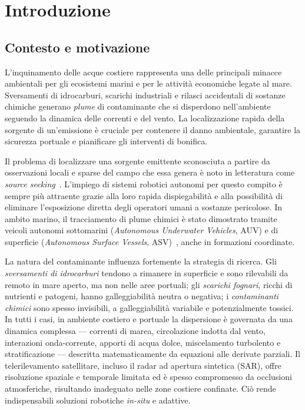\chapter{Introduzione}
\label{cap:intro}

\section{Contesto e motivazione}

L'inquinamento delle acque costiere rappresenta una delle principali minacce
ambientali per gli ecosistemi marini e per le attivit\`a economiche legate al mare.
Sversamenti di idrocarburi, scarichi industriali e rilasci accidentali di sostanze
chimiche generano \emph{plume} di contaminante che si disperdono nell'ambiente
seguendo la dinamica delle correnti e del vento. La localizzazione rapida della
sorgente di un'emissione \`e cruciale per contenere il danno ambientale, garantire la
sicurezza portuale e pianificare gli interventi di bonifica.

Il problema di localizzare una sorgente emittente sconosciuta a partire da osservazioni
locali e sparse del campo che essa genera \`e noto in letteratura come \emph{source
seeking}~\citep{source_seeking}. L'impiego di sistemi robotici autonomi per questo
compito \`e sempre pi\`u attraente grazie alla loro rapida dispiegabilit\`a e alla
possibilit\`a di eliminare l'esposizione diretta degli operatori umani a sostanze
pericolose. In ambito marino, il tracciamento di plume chimici \`e stato dimostrato
tramite veicoli autonomi sottomarini (\emph{Autonomous Underwater Vehicles}, AUV) e di
superficie (\emph{Autonomous Surface Vessels}, ASV)~\citep{plume_tracing}, anche in
formazioni coordinate.

La natura del contaminante influenza fortemente la strategia di ricerca. Gli
\emph{sversamenti di idrocarburi} tendono a rimanere in superficie e sono rilevabili da
remoto in mare aperto, ma non nelle aree portuali; gli \emph{scarichi fognari}, ricchi
di nutrienti e patogeni, hanno galleggiabilit\`a neutra o negativa; i \emph{contaminanti
chimici} sono spesso invisibili, a galleggiabilit\`a variabile e potenzialmente tossici.
In tutti i casi, in ambiente costiero e portuale la dispersione \`e governata da una
dinamica complessa --- correnti di marea, circolazione indotta dal vento, interazioni
onda-corrente, apporti di acqua dolce, miscelamento turbolento e stratificazione ---
descritta matematicamente da equazioni alle derivate parziali. Il telerilevamento
satellitare, incluso il radar ad apertura sintetica (SAR), offre risoluzione spaziale e
temporale limitata ed \`e spesso compromesso da occlusioni atmosferiche, risultando
inadeguato nelle zone costiere confinate. Ci\`o rende indispensabili soluzioni robotiche
\emph{in-situ} e adattive.

